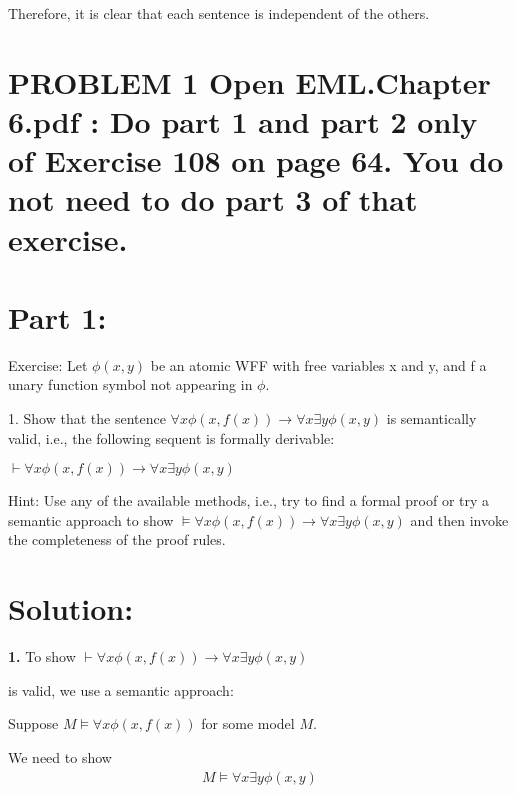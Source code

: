 \documentclass{article}
\begin{document}
Therefore, it is clear that each sentence is independent of the others.
\newpage




\section*{PROBLEM 1 Open EML.Chapter 6.pdf : Do part 1 and part 2 only of Exercise 108 on page
64. You do not need to do part 3 of that exercise.}

\section*{Part 1:}
\begin{mdframed}
    Exercise:
    Let $\phi(x, y)$ be an atomic WFF with free variables x and y, and f a unary function symbol not appearing in $\phi$.
    \vspace{1em}

    1. Show that the sentence $\forall x \phi(x, f (x)) \rightarrow \forall x\exists y \phi(x, y)$ is semantically
    valid, i.e., the following sequent is formally derivable:
    \vspace{1em}

    $\vdash \forall x \phi(x, f (x)) \rightarrow \forall x \exists y \phi(x, y)$
    \vspace{1em}

    Hint: Use any of the available methods, i.e., try to find a formal proof
    or try a semantic approach to show $\models \forall x \phi(x, f (x)) \rightarrow \forall x\exists y \phi(x, y)$
    and then invoke the completeness of the proof rules.
\end{mdframed}

\section*{Solution:}
\textbf{1.} To show $\vdash \forall x \phi(x, f(x)) \rightarrow \forall x \exists y \phi(x, y)$


\vspace{1em}
is valid, we use a semantic approach:

\vspace{1em}
Suppose $M \models \forall x \phi(x, f(x))$ for some model $M$. 

\vspace{1em}
We need to show 
\[\begin{aligned}
    M \models \forall x \exists y \phi(x, y)
\end{aligned}\]
\end{document}

